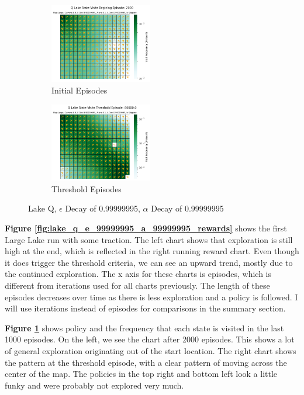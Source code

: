 \documentclass[letterpaper]{article} %
\begin{document}
\begin{figure}[!htb]
	\begin{subfigure}[b]{0.25\textwidth}
		\centering
		\includegraphics[width=1.75in]{Figures/Q_Lake_State_Visits_Begining_Episode__2000_Map_Large__Gamma_0_9__E_Dec_0_99999995__Alpha_0_1__A_Dec_0_99999995__Is_Slippery.png}
		\caption{Initial Episodes}
  	\end{subfigure}%
	\begin{subfigure}[b]{0.25\textwidth}
		\centering
		\includegraphics[width=1.75in]{Figures/Q_Lake_State_Visits_Threshold_Episode__80000_0_Map_Large__Gamma_0_9__E_Dec_0_99999995__Alpha_0_1__A_Dec_0_99999995__Is_Slippery.png}
		\caption{Threshold Episodes}
  	\end{subfigure}%
\caption{Lake Q,  $\epsilon$ Decay of 0.99999995, $\alpha$ Decay of 0.99999995}
\label{fig:lake_q_e_99999995_a_99999995_maps}
\end{figure}

\textbf{Figure \ref{fig:lake_q_e_99999995_a_99999995_rewards}} shows the first Large Lake run with some traction.  The left chart shows that exploration is still  high at the end, which is reflected in the right running reward chart.  Even though it does trigger the threshold criteria, we can see an upward trend, mostly due to the continued exploration.  The x axis for these charts is episodes, which is different from iterations used for all charts previously.   The length of these episodes decreases over time as there is less exploration and a policy is followed.   I will use iterations instead of episodes for comparisons in the summary section.

\textbf{Figure \ref{fig:lake_q_e_99999995_a_99999995_maps}} shows policy and the frequency that each state is visited in the last 1000 episodes.  On the left, we see the chart after 2000 episodes.  This shows a lot of general exploration originating out of the start location.  The right chart shows the pattern at the threshold episode, with a clear pattern of moving across the center of the map.  The policies in the top right and bottom left look a little funky and were probably not explored very much.
\end{document}
